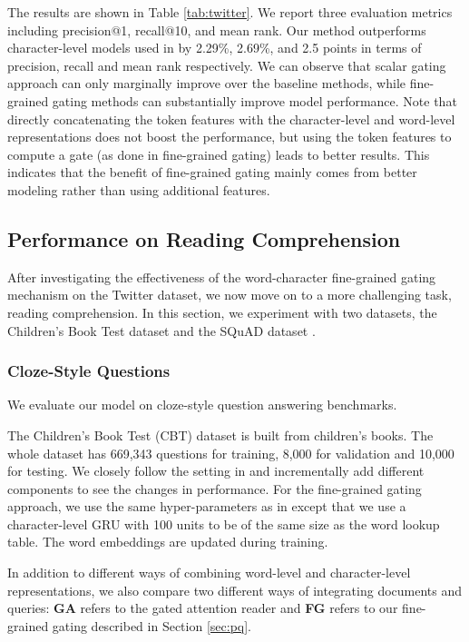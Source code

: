 \documentclass{article} \usepackage{iclr2017_conference,times}
\begin{document}
The results are shown in Table \ref{tab:twitter}. We report three evaluation metrics including precision@1, recall@10, and mean rank. Our method outperforms character-level models used in \cite{dhingra2016tweet2vec} by 2.29\%, 2.69\%, and 2.5 points in terms of precision, recall and mean rank respectively. We can observe that scalar gating approach \citep{miyamoto2016gated} can only marginally improve over the baseline methods, while fine-grained gating methods can substantially improve model performance. Note that directly concatenating the token features with the character-level and word-level representations does not boost the performance, but using the token features to compute a gate (as done in fine-grained gating) leads to better results. This indicates that the benefit of fine-grained gating mainly comes from better modeling rather than using additional features.


\subsection{Performance on Reading Comprehension}

After investigating the effectiveness of the word-character fine-grained gating mechanism on the Twitter dataset, we now move on to a more challenging task, reading comprehension. In this section, we experiment with two datasets, the Children's Book Test dataset \citep{hill2015goldilocks} and the SQuAD dataset \citep{pranav2016squad}.

\subsubsection{Cloze-Style Questions}

We evaluate our model on cloze-style question answering benchmarks.

The Children's Book Test (CBT) dataset is built from children's books. The whole dataset has 669,343 questions for training, 8,000 for validation and 10,000 for testing. We closely follow the setting in \cite{dhingra2016gated} and incrementally add different components to see the changes in performance. For the fine-grained gating approach, we use the same hyper-parameters as in \cite{dhingra2016gated} except that we use a character-level GRU with 100 units to be of the same size as the word lookup table. The word embeddings are updated during training.

In addition to different ways of combining word-level and character-level representations, we also compare two different ways of integrating documents and queries: \textbf{GA} refers to the gated attention reader \citep{dhingra2016gated} and \textbf{FG} refers to our fine-grained gating described in Section \ref{sec:pq}.
\end{document}
